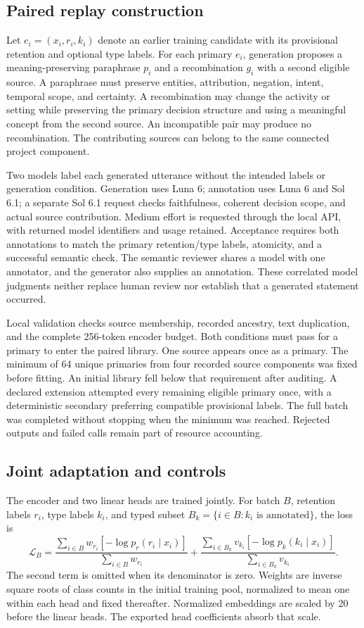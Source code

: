 \subsection{Paired replay construction}
Let $e_i=(x_i,r_i,k_i)$ denote an earlier training candidate with its provisional retention and optional type labels. For each primary $e_i$, generation proposes a meaning-preserving paraphrase $p_i$ and a recombination $g_i$ with a second eligible source. A paraphrase must preserve entities, attribution, negation, intent, temporal scope, and certainty. A recombination may change the activity or setting while preserving the primary decision structure and using a meaningful concept from the second source. An incompatible pair may produce no recombination. The contributing sources can belong to the same connected project component.

Two models label each generated utterance without the intended labels or generation condition. Generation uses Luna 6; annotation uses Luna 6 and Sol 6.1; a separate Sol 6.1 request checks faithfulness, coherent decision scope, and actual source contribution. Medium effort is requested through the local API, with returned model identifiers and usage retained. Acceptance requires both annotations to match the primary retention/type labels, atomicity, and a successful semantic check. The semantic reviewer shares a model with one annotator, and the generator also supplies an annotation. These correlated model judgments neither replace human review nor establish that a generated statement occurred.

Local validation checks source membership, recorded ancestry, text duplication, and the complete 256-token encoder budget. Both conditions must pass for a primary to enter the paired library. One source appears once as a primary. The minimum of 64 unique primaries from four recorded source components was fixed before fitting. An initial library fell below that requirement after auditing. A declared extension attempted every remaining eligible primary once, with a deterministic secondary preferring compatible provisional labels. The full batch was completed without stopping when the minimum was reached. Rejected outputs and failed calls remain part of resource accounting.

\subsection{Joint adaptation and controls}
The encoder and two linear heads are trained jointly. For batch $B$, retention labels $r_i$, type labels $k_i$, and typed subset $B_k=\{i\in B:k_i\text{ is annotated}\}$, the loss is
\[
 \mathcal L_B=
 \frac{\sum_{i\in B}w_{r_i}[-\log p_r(r_i\mid x_i)]}
      {\sum_{i\in B}w_{r_i}}
 +\frac{\sum_{i\in B_k}v_{k_i}[-\log p_k(k_i\mid x_i)]}
       {\sum_{i\in B_k}v_{k_i}}.
\]
The second term is omitted when its denominator is zero. Weights are inverse square roots of class counts in the initial training pool, normalized to mean one within each head and fixed thereafter. Normalized embeddings are scaled by 20 before the linear heads. The exported head coefficients absorb that scale.

